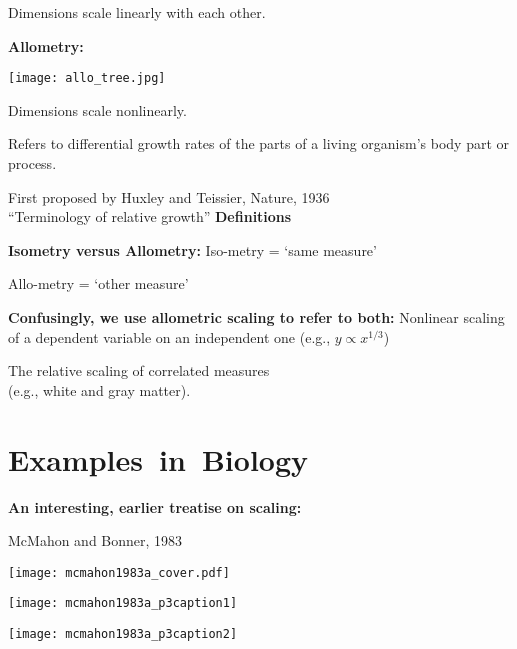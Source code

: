Dimensions scale linearly with each other.


\textbf{Allometry:}

\begin{marginfigure}[]
  \texttt{[image: allo\_tree.jpg]}\\
\end{marginfigure}


Dimensions scale nonlinearly.


\textbf{}
Refers to differential growth rates of the parts
of a living organism's body part or process.

First proposed by Huxley and Teissier, Nature, 1936\\
``Terminology of relative growth''\cite{huxley1936a,shingleton2010a}
\textbf{Definitions}

\textbf{Isometry versus Allometry:}
Iso-metry = `same measure'

Allo-metry = `other measure'
\bigskip

\textbf{Confusingly, we use allometric scaling to refer to both:}
Nonlinear scaling of a dependent variable
on an independent one (e.g., $y \propto x^{1/3}$)

The relative scaling of correlated measures\\
(e.g., white and gray matter).

\section{Examples\ in\ Biology}
\textbf{An interesting, earlier treatise on scaling:}

McMahon and Bonner, 1983\cite{mcmahon1983a}

\begin{marginfigure}[]
  \texttt{[image: mcmahon1983a\_cover.pdf]}
\end{marginfigure}


\begin{marginfigure}[]
  \texttt{[image: mcmahon1983a\_p3caption1]}
\end{marginfigure}

\begin{marginfigure}[]
  \texttt{[image: mcmahon1983a\_p3caption2]}
\end{marginfigure}

